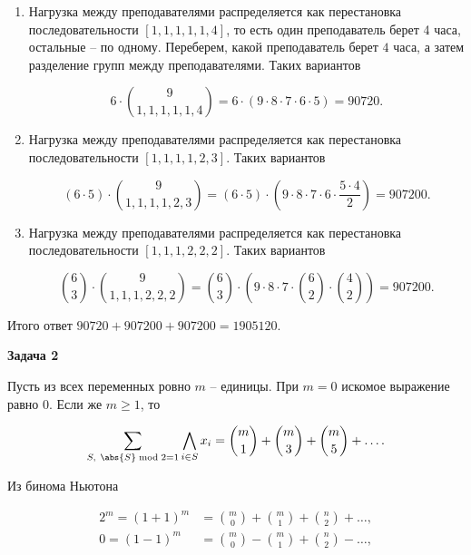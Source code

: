 		\begin{enumerate}
			\item Нагрузка между преподавателями распределяется как перестановка последовательности $[1, 1, 1, 1, 1, 4]$, то есть один преподаватель берет 4 часа, остальные -- по одному. Переберем, какой преподаватель берет $4$ часа, а затем разделение групп между преподавателями. Таких вариантов

			\begin{equation*}
				6 \cdot \binom{9}{1,1,1,1,1,4} = 6 \cdot (9 \cdot 8 \cdot 7 \cdot 6 \cdot 5) = 90720.
			\end{equation*}

			\item Нагрузка между преподавателями распределяется как перестановка последовательности $[1, 1, 1, 1, 2, 3]$. Таких вариантов

			\begin{equation*}
				(6 \cdot 5) \cdot \binom{9}{1,1,1,1,2,3} = (6 \cdot 5) \cdot \left( 9 \cdot 8 \cdot 7 \cdot 6 \cdot \frac{5 \cdot 4}{2} \right) = 907200.
			\end{equation*}

			\item Нагрузка между преподавателями распределяется как перестановка последовательности $[1, 1, 1, 2, 2, 2]$. Таких вариантов

			\begin{equation*}
				\binom{6}{3} \cdot \binom{9}{1,1,1,2,2,2} = \binom{6}{3} \cdot \left( 9 \cdot 8 \cdot 7 \cdot \binom{6}{2} \cdot \binom{4}{2} \right) = 907200.
			\end{equation*}
		\end{enumerate}

		Итого ответ $90720 + 907200 + 907200 = 1905120$.


	\begin{center}
    \textbf{Задача 2}
\end{center}
		Пусть из всех переменных ровно $m$ -- единицы. При $m = 0$ искомое выражение равно $0$. Если же $m \ge 1$, то

		\begin{equation*}
			\sum_{S, \ \abs{S} \bmod 2 = 1} \bigwedge_{i \in S} x_i = \binom{m}{1} + \binom{m}{3} + \binom{m}{5} + \dots.
		\end{equation*}

		Из бинома Ньютона

		\begin{align*}
			2^m = (1 + 1)^m &= \binom{m}{0} + \binom{m}{1} + \binom{n}{2} + \dots, \\
			0 = (1 - 1)^m &= \binom{m}{0} - \binom{m}{1} + \binom{n}{2} - \dots,
		\end{align*}

